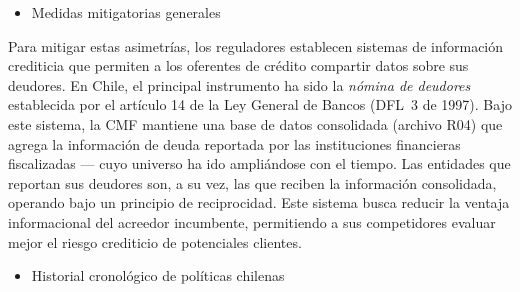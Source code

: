 \documentclass[11pt]{article}
\theoremstyle{plain}
\theoremstyle{plain}
\begin{document}
\begin{itemize}
    \item Medidas mitigatorias generales%
\end{itemize}
Para mitigar estas asimetrías, los reguladores establecen sistemas de información crediticia que permiten a los oferentes de crédito compartir datos sobre sus deudores. En Chile, el principal instrumento ha sido la \textit{nómina de deudores} establecida por el artículo 14 de la Ley General de Bancos (DFL~3 de 1997). Bajo este sistema, la CMF mantiene una base de datos consolidada (archivo R04) que agrega la información de deuda reportada por las instituciones financieras fiscalizadas --- cuyo universo ha ido ampliándose con el tiempo. Las entidades que reportan sus deudores son, a su vez, las que reciben la información consolidada, operando bajo un principio de reciprocidad. Este sistema busca reducir la ventaja informacional del acreedor incumbente, permitiendo a sus competidores evaluar mejor el riesgo crediticio de potenciales clientes.

\begin{itemize}
    \item Historial cronológico de políticas chilenas%
\end{itemize}   
\end{document}
